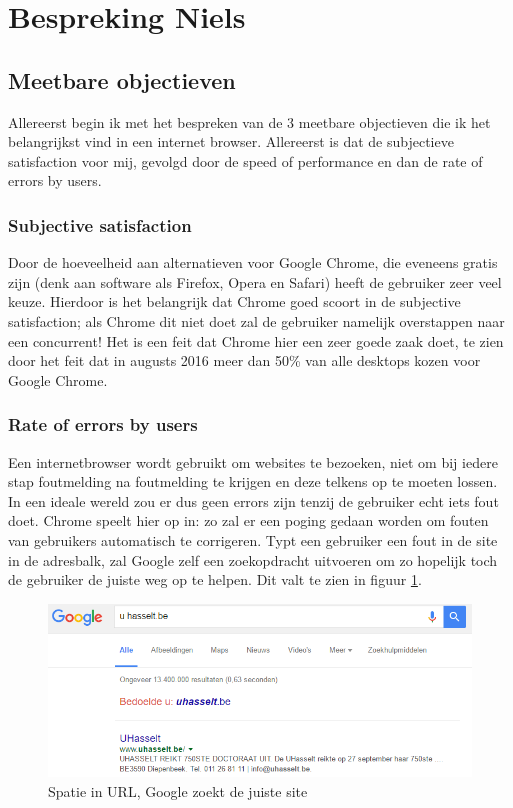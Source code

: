\documentclass[12pt]{article}
\begin{document}
\section{Bespreking Niels}
\subsection{Meetbare objectieven}
Allereerst begin ik met het bespreken van de 3 meetbare objectieven die ik het belangrijkst vind in een internet browser. Allereerst is dat de subjectieve satisfaction voor mij, gevolgd door de speed of performance en dan de rate of errors by users.
\subsubsection{Subjective satisfaction}
Door de hoeveelheid aan alternatieven voor Google Chrome, die eveneens gratis zijn (denk aan software als Firefox, Opera en Safari) heeft de gebruiker zeer veel keuze. Hierdoor is het belangrijk dat Chrome goed scoort in de subjective satisfaction; als Chrome dit niet doet zal de gebruiker namelijk overstappen naar een concurrent! Het is een feit dat Chrome hier een zeer goede zaak doet, te zien door het feit dat in augusts 2016 meer dan 50\% van alle desktops kozen voor Google Chrome.\cite{NetShare}
\subsubsection{Rate of errors by users}
Een internetbrowser wordt gebruikt om websites te bezoeken, niet om bij iedere stap foutmelding na foutmelding te krijgen en deze telkens op te moeten lossen. In een ideale wereld zou er dus geen errors zijn tenzij de gebruiker echt iets fout doet. Chrome speelt hier op in: zo zal er een poging gedaan worden om fouten van gebruikers automatisch te corrigeren. Typt een gebruiker een fout in de site in de adresbalk, zal Google zelf een zoekopdracht uitvoeren om zo hopelijk toch de gebruiker de juiste weg op te helpen. Dit valt te zien in figuur \ref{fig:search}.
\begin{figure}
	\centering
	\includegraphics[width=1\textwidth]{search.png}
	\caption{Spatie in URL, Google zoekt de juiste site}
	\label{fig:search}
\end{figure}
\newpage
\end{document}
